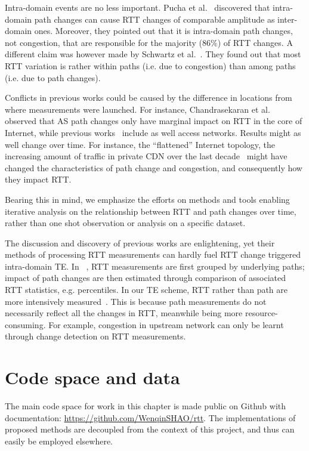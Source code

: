 Intra-domain events are no less important. Pucha et al.~\cite{Pucha2007} discovered that intra-domain path changes can cause RTT changes of comparable amplitude as inter-domain ones.
Moreover, they pointed out that it is intra-domain path changes, not congestion, that are responsible for the majority ($86\%$) of RTT changes. %
A different claim was however made by Schwartz et al.~\cite{Schwartz2010}. They found out that most RTT variation is rather within paths (i.e. due to congestion) than among paths (i.e. due to path changes).

Conflicts in previous works could be caused by the difference in locations from where measurements were launched.
For instance, Chandrasekaran et al.~\cite{Chandrasekaran} observed that AS path changes only have marginal impact on RTT in the core of Internet, while previous works~\cite{Pucha2007, Schwartz2010} include as well access networks.
Results might as well change over time. For instance, the ``flattened'' Internet topology, the increasing amount of traffic in private CDN over the last decade~\cite{Labovitz2011, Roughan2011} might have changed the characteristics of path change and congestion, and consequently how they impact RTT.

Bearing this in mind, we emphasize the efforts on methods and tools enabling iterative
analysis on the relationship between RTT and path changes over time, rather than one shot observation or analysis on a specific dataset.

The discussion and discovery of previous works are enlightening, yet their methods of processing RTT measurements can hardly fuel RTT change triggered intra-domain TE.
In ~\cite{Pucha2007, Schwartz2010, Chandrasekaran},
RTT measurements are first grouped by underlying paths; impact of path changes are then estimated through comparison of associated RTT statistics, e.g. percentiles.
In our TE scheme, RTT rather than path are more intensively measured~\cite{shao2016}.
This is because path measurements do not necessarily reflect all the changes in RTT, meanwhile being more resource-consuming.
For example, congestion in upstream network can only be learnt through change detection on RTT measurements.

\section{Code space and data}
\label{sec:cpt_data}
The main code space for work in this chapter is made public on Github with documentation: \url{https://github.com/WenqinSHAO/rtt}.
The implementations of proposed methods are decoupled from the context of this project, and thus can easily be employed elsewhere.  

